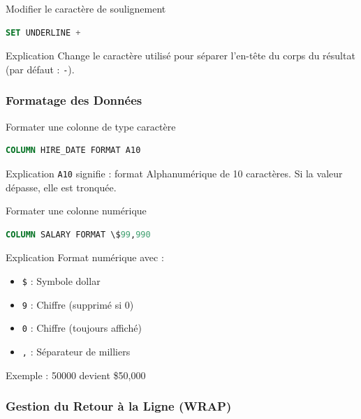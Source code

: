 \documentclass[12pt,a4paper]{article}
\begin{document}
\begin{commande}{Modifier le caractère de soulignement}
\begin{lstlisting}[language=SQL]
SET UNDERLINE +
\end{lstlisting}
\end{commande}

\begin{explication}{Explication}
Change le caractère utilisé pour séparer l'en-tête du corps du résultat (par défaut : \texttt{-}).
\end{explication}

\subsubsection{Formatage des Données}

\begin{commande}{Formater une colonne de type caractère}
\begin{lstlisting}[language=SQL]
COLUMN HIRE_DATE FORMAT A10
\end{lstlisting}
\end{commande}

\begin{explication}{Explication}
\texttt{A10} signifie : format Alphanumérique de 10 caractères. Si la valeur dépasse, elle est tronquée.
\end{explication}

\begin{commande}{Formater une colonne numérique}
\begin{lstlisting}[language=SQL]
COLUMN SALARY FORMAT \$99,990
\end{lstlisting}
\end{commande}

\begin{explication}{Explication}
Format numérique avec :
\begin{itemize}
    \item \texttt{\$} : Symbole dollar
    \item \texttt{9} : Chiffre (supprimé si 0)
    \item \texttt{0} : Chiffre (toujours affiché)
    \item \texttt{,} : Séparateur de milliers
\end{itemize}
Exemple : 50000 devient \$50,000
\end{explication}

\subsubsection{Gestion du Retour à la Ligne (WRAP)}
\end{document}
